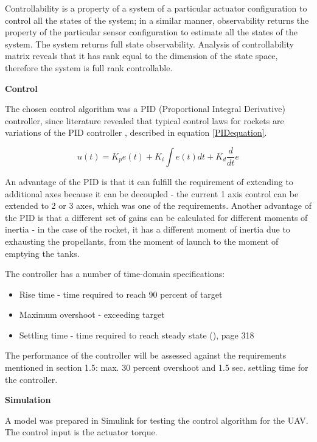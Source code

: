 Controllability is a property of a system of a particular actuator configuration to control all the states of the system; in a similar manner, observability returns the property of the particular sensor configuration to estimate all the states of the system. \cite{preumont2018vibration}
The system returns full state observability. 
Analysis of controllability matrix reveals that it has rank equal to the dimension of the state space, therefore the system is full rank controllable.

\textbf{Control}

The chosen control algorithm was a PID (Proportional Integral Derivative) controller, since literature revealed that typical control laws for rockets are variations of the PID controller \cite{de2012spacecraft} \cite{taylor2017introduction}, described in equation  \ref{PIDequation}.

\begin{equation}\label{PIDequation}
u(t)=K_{p}e(t) + K_{i}\int{e}(t)dt+K_{d}\frac{d}{dt}e 
\end{equation}

An advantage of the PID is that it can fulfill the requirement of extending to additional axes because it can be decoupled - the current 1 axis control can be extended to 2 or 3 axes, which was one of the requirements. Another advantage of the PID is that a different set of gains can be calculated for different moments of inertia - in the case of the rocket, it has a different moment of inertia due to exhausting the propellants, from the moment of launch to the moment of emptying the tanks. 

The controller has a number of time-domain specifications:

\begin{itemize}
\item Rise time - time required to reach 90 percent of target
\item Maximum overshoot - exceeding target
\item Settling time - time required to reach steady state (\cite{de2012spacecraft}), page 318
\end{itemize}

The performance of the controller will be assessed against the requirements mentioned in section 1.5: max. 30 percent overshoot and 1.5 sec. settling time for the controller. 


\textbf{Simulation}

A model was prepared in Simulink for testing the control algorithm for the UAV. 
The control input is the actuator torque.

